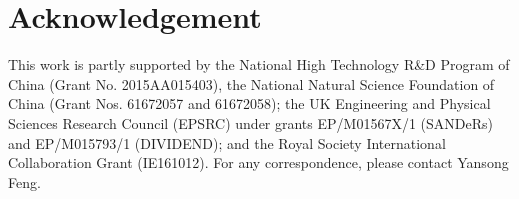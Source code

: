 \section*{Acknowledgement}
\vspace{-1mm} This work is partly supported by the National High Technology R\&D Program of China (Grant No. 2015AA015403), the National
Natural Science Foundation of China (Grant Nos. 61672057 and 61672058); the UK Engineering and Physical Sciences Research Council (EPSRC)
under grants EP/M01567X/1 (SANDeRs) and EP/M015793/1 (DIVIDEND); and the Royal Society International Collaboration Grant (IE161012). For
any correspondence, please contact Yansong Feng.
